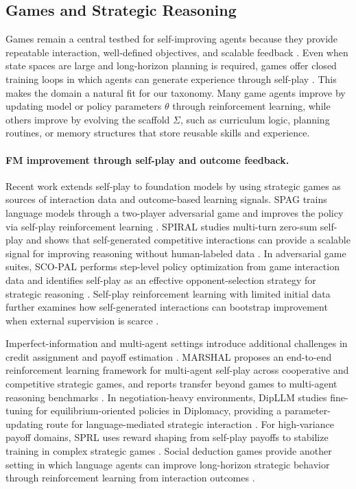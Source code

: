 \documentclass{article}
\begin{document}
\subsection{Games and Strategic Reasoning}

Games remain a central testbed for self-improving agents because they provide repeatable interaction, well-defined objectives, and scalable feedback \citep{stanic2023learning}. Even when state spaces are large and long-horizon planning is required, games offer closed training loops in which agents can generate experience through self-play \citep{silver2018general, silver2017masteringchessshogiselfplay, Schrittwieser_2020, openai2019dota2largescale}. This makes the domain a natural fit for our taxonomy. Many game agents improve by updating model or policy parameters $\theta$ through reinforcement learning, while others improve by evolving the scaffold $\Sigma$, such as curriculum logic, planning routines, or memory structures that store reusable skills and experience.

\paragraph{FM improvement through self-play and outcome feedback.}
Recent work extends self-play to foundation models by using strategic games as sources of interaction data and outcome-based learning signals. SPAG trains language models through a two-player adversarial game and improves the policy via self-play reinforcement learning \citep{cheng2025selfplayingadversariallanguagegame}. SPIRAL studies multi-turn zero-sum self-play and shows that self-generated competitive interactions can provide a scalable signal for improving reasoning without human-labeled data \citep{liu2025spiralselfplayzerosumgames}. In adversarial game suites, SCO-PAL performs step-level policy optimization from game interaction data and identifies self-play as an effective opponent-selection strategy for strategic reasoning \citep{zhang2025enhancinglanguageagentstrategic}. Self-play reinforcement learning with limited initial data further examines how self-generated interactions can bootstrap improvement when external supervision is scarce \citep{fang2025serl}.

Imperfect-information and multi-agent settings introduce additional challenges in credit assignment and payoff estimation \citep{zhuge2023mindstorms, stanic2023learning}. MARSHAL proposes an end-to-end reinforcement learning framework for multi-agent self-play across cooperative and competitive strategic games, and reports transfer beyond games to multi-agent reasoning benchmarks \citep{yuan2026mars}. In negotiation-heavy environments, DipLLM studies fine-tuning for equilibrium-oriented policies in Diplomacy, providing a parameter-updating route for language-mediated strategic interaction \citep{xu2025dipllmfinetuningllmstrategic}. For high-variance payoff domains, SPRL uses reward shaping from self-play payoffs to stabilize training in complex strategic games \citep{anonymous2025llm}. Social deduction games provide another setting in which language agents can improve long-horizon strategic behavior through reinforcement learning from interaction outcomes \citep{xu2025languageagentsreinforcementlearning}.
\end{document}
